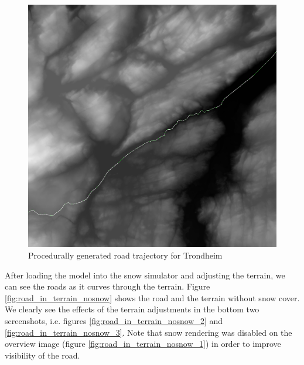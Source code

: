 \begin{figure}[ht]
\centering
\includegraphics[width=\textwidth]{figure/trajectory_trondheim}
\caption{Procedurally generated road trajectory for Trondheim}
\label{fig:trajectory_trondheim}
\end{figure}

After loading the model into the snow simulator and adjusting the terrain, we can see the roads as it curves through the terrain. Figure \ref{fig:road_in_terrain_nosnow} shows the road and the terrain without snow cover. We clearly see the effects of the terrain adjustments in the bottom two screenshots, i.e. figures \ref{fig:road_in_terrain_nosnow_2} and \ref{fig:road_in_terrain_nosnow_3}. Note that snow rendering was disabled on the overview image (figure \ref{fig:road_in_terrain_nosnow_1}) in order to improve visibility of the road. 

